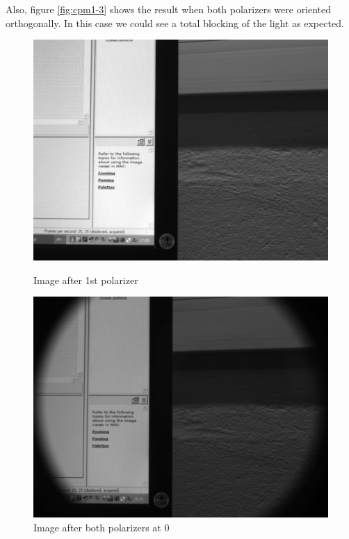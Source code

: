 \documentclass{article}
\begin{document}
Also, figure \ref{fig:cpm1-3} shows the result when both polarizers were oriented
orthogonally. In this case we could see a total blocking of the light as expected.

\begin{figure}[ht]
\centering
\begin{minipage}[b]{0.3\linewidth}
\includegraphics[width=1.0\textwidth,natwidth=100,natheight=100]{../CPM/im0-1pol.png}
  \caption{Image after 1st polarizer}
  \label{fig:cpm1-1}
\end{minipage}
\quad
\begin{minipage}[b]{0.3\linewidth}
\includegraphics[width=1.0\textwidth,natwidth=100,natheight=100]{../CPM/im0.png}
  \caption{Image after both polarizers at 0}

\end{minipage}
\end{figure}
\end{document}
